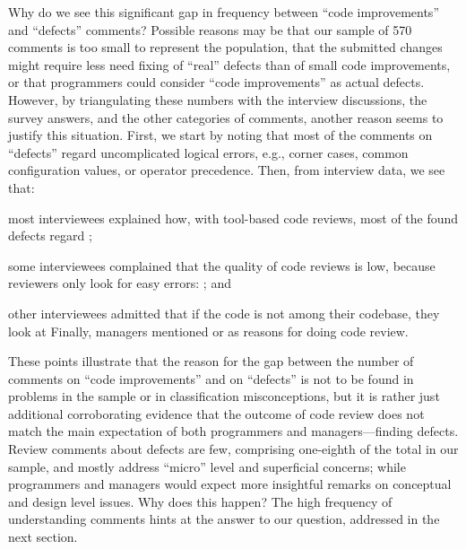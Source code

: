 Why do we see this significant gap in frequency between ``code improvements'' and ``defects'' comments? Possible reasons may be that our sample of 570 comments is too small to represent the population, that the submitted changes might require less need fixing of ``real'' defects than of small code improvements, or that programmers could consider ``code improvements'' as actual defects. However, by triangulating these numbers with the interview discussions, the survey answers, and the other categories of comments, another reason seems to justify this situation. First, we start by noting that most of the comments on ``defects'' regard uncomplicated logical errors, e.g., corner cases, common configuration values, or operator precedence. Then, from interview data, we see that: \begin{inparaenum}[(1)]
\item most interviewees explained how, with tool-based code reviews, most of the found defects regard ; 
\item some interviewees complained that the quality of code reviews is low, because reviewers only look for easy errors: ; and 
\item other interviewees admitted that if the code is not among their codebase, they look at  Finally, managers mentioned  or  as reasons for doing code review.
\end{inparaenum}
These points illustrate that the reason for the gap between the number of comments on ``code improvements'' and on ``defects'' is not to be found in problems in the sample or in classification misconceptions, but it is rather just additional corroborating evidence that the outcome of code review does not match the main expectation of both programmers and managers—finding defects. Review comments about defects are few, comprising one-eighth of the total in our sample, and mostly address ``micro'' level and superficial concerns; while programmers and managers would expect more insightful remarks on conceptual and design level issues. Why does this happen? The high frequency of understanding comments hints at the answer to our question, addressed in the next section.